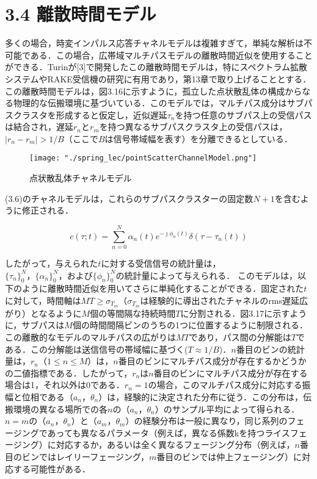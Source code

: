 \documentclass[dvipdfmx]{jsarticle}
\begin{document}
\section*{3.4 離散時間モデル}



多くの場合，時変インパルス応答チャネルモデルは複雑すぎて，単純な解析は不可能である．この場合，広帯域マルチパスモデルの離散時間近似を使用することができる．Turinが[3]で開発したこの離散時間モデルは，特にスペクトラム拡散システムやRAKE受信機の研究に有用であり，第13章で取り上げることとする．この離散時間モデルは，図3.16に示すように，孤立した点状散乱体の構成からなる物理的な伝搬環境に基づいている．このモデルでは，マルチパス成分はサブパスクラスタを形成すると仮定し，近似遅延$\tau_n$を持つ任意のサブパス上の受信パスは結合され，遅延$r_n$と$r_m$を持つ異なるサブパスクラスタ上の受信パスは，$|r_n - r_m|> 1 / B$（ここで$B$は信号帯域幅を表す）を分離できるとしている．

\begin{figure}[H]
\begin{center}
\texttt{[image: "./spring\_lec/pointScatterChannelModel.png"]}
\end{center}
\caption{点状散乱体チャネルモデル}
\end{figure}

(3.6)のチャネルモデルは，これらのサブパスクラスターの固定数$N + 1$を含むように修正される．

\begin{equation}\label{}
c(\tau;t) = \sum^N_{n=0} \alpha_n (t)e^{-\jmath \phi_n (t)} \delta(\tau - \tau_n (t))
\tag{3.64}
\end{equation}

したがって，与えられた$t$に対する受信信号の統計量は，$\{\tau_n\}^N_0， \{\alpha_n\}^N_0， および\{\phi_n\}^N_0$の統計量によって与えられる．
このモデルは，以下のように離散時間近似を用いてさらに単純化することができる．固定された$t$に対して，時間軸は$MT \geq \sigma_{T_m}$（$\sigma_{T_m}$は経験的に導出されたチャネルのrms遅延広がり）となるように$M$個の等間隔な持続時間$T$に分割される．図3.17に示すように，サブパスは$M$個の時間間隔ビンのうちの1つに位置するように制限される．この離散的なモデルのマルチパスの広がりは$MT$であり，パス間の分解能は$T$である．この分解能は送信信号の帯域幅に基づく($T \approx 1 / B$)．$n$番目のビンの統計量は，$r_n（1 \leq n \leq M）$は，$n$番目のビンにマルチパス成分が存在するかどうかの二値指標である．したがって，$r_n$は$n$番目のビンにマルチパス成分が存在する場合は1，それ以外は0である．$r_n = 1$の場合，このマルチパス成分に対応する振幅と位相である$（a_n， \theta_n）$は，経験的に決定された分布に従う．この分布は，伝搬環境の異なる場所での各$n$の$（a_n， \theta_n）$のサンプル平均によって得られる．$n = m$の$（a_n，\theta_n）$と$（a_m，\theta_m）$の経験分布は一般に異なり，同じ系列のフェージングであっても異なるパラメータ（例えば，異なる係数kを持つライスフェージング）に対応するか，あるいは全く異なるフェージング分布（例えば，$n$番目のビンではレイリーフェージング，$m$番目のビンでは仲上フェージング）に対応する可能性がある．
\end{document}
